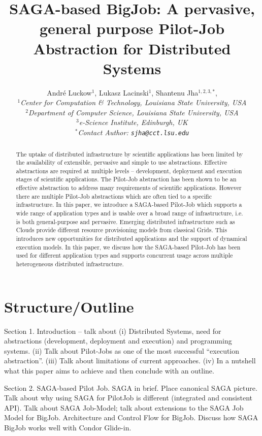 \documentclass[conference,final]{IEEEtran}
\title{SAGA-based BigJob: A pervasive, general purpose Pilot-Job Abstraction for Distributed Systems}
\author{
Andr\'e Luckow$^{1}$, Lukasz Lacinski$^{1}$,   Shantenu Jha$^{1,2,3,*}$,\\
  \small{\emph{$^{1}$Center for Computation \& Technology, Louisiana State University, USA}}\\
  \small{\emph{$^{2}$Department of Computer Science, Louisiana State University, USA}}\\
  \small{\emph{$^{3}$e-Science Institute, Edinburgh, UK}}\\
  \small{\emph{$^{*}$Contact Author: \texttt{sjha@cct.lsu.edu}}}\\
}
\newcommand{\up}{\vspace*{-1em}}
\begin{document}
 

\maketitle    


\begin{abstract}
  The uptake of distributed infrastructure by scientific applications
  has been limited by the availability of extensible, pervasive and
  simple to use abstractions. Effective abstractions are required at
  multiple levels -- development, deployment and execution stages of
  scientific applications. The Pilot-Job abstraction has been shown to
  be an effective abstraction to address many requirements of
  scientific applications. However there are multiple Pilot-Job
  abstractions which are often tied to a specific infrastructure.  In
  this paper, we introduce a SAGA-based Pilot-Job which supports a
  wide range of application types and is usable over a broad range of
  infrastructure, i.e. is both general-purpose and pervasive.
  Emerging distributed infrastructure such as Clouds provide different
  resource provisioning models from classical Grids. This introduces
  new opportunities for distributed applications and the support of
  dynamical execution models. In this paper, we discuss how the
  SAGA-based Pilot-Job has been used for different application types
  and supports concurrent usage across multiple heterogeneous
  distributed infrastructure.
\end{abstract}


\section*{Structure/Outline}

Section 1. Introduction -- talk about (i) Distributed Systems, need
for abstractions (development, deployment and execution) and
programming systems. (ii) Talk about Pilot-Jobs as one of the most
successful ``execution abstraction''. (iii) Talk about limitations of
current approaches. (iv) In a nutshell what this paper aims to achieve
and then conclude with an outline.

\bigskip

Section 2. SAGA-based Pilot Job.  SAGA in brief. Place canonical SAGA
picture. Talk about why using SAGA for PilotJob is different
(integrated and consistent API). Talk about SAGA Job-Model; talk about
extensions to the SAGA Job Model for BigJob.  Architecture and Control
Flow for BigJob. Discuss how SAGA BigJob works well with Condor
Glide-in.
\end{document}

